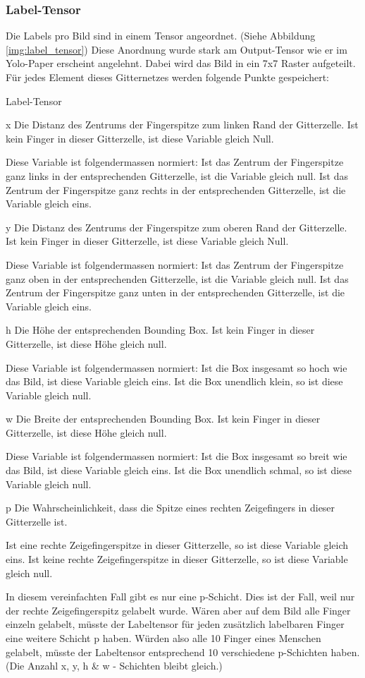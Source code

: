 \subsubsection{Label-Tensor}
\label{chapter:label_tensor}
Die Labels pro Bild sind in einem Tensor angeordnet. 
(Siehe Abbildung \ref{img:label_tensor})
Diese Anordnung wurde stark am Output-Tensor wie er im Yolo-Paper \cite{yolo} erscheint angelehnt.
Dabei wird das Bild in ein 7x7 Raster aufgeteilt.
Für jedes Element dieses Gitternetzes werden folgende Punkte gespeichert:
\begin{labeling}{Label-Tensor}
\item[x] Die Distanz des Zentrums der Fingerspitze zum linken Rand der Gitterzelle.
Ist kein Finger in dieser Gitterzelle, ist diese Variable gleich Null.

Diese Variable ist folgendermassen normiert: 
Ist das Zentrum der Fingerspitze ganz links in der entsprechenden Gitterzelle, ist die Variable gleich null.
Ist das Zentrum der Fingerspitze ganz rechts in der entsprechenden Gitterzelle, ist die Variable gleich eins.
\item[y] Die Distanz des Zentrums der Fingerspitze zum oberen Rand der Gitterzelle.
Ist kein Finger in dieser Gitterzelle, ist diese Variable gleich Null. 

Diese Variable ist folgendermassen normiert:
Ist das Zentrum der Fingerspitze ganz oben in der entsprechenden Gitterzelle, ist die Variable gleich null.
Ist das Zentrum der Fingerspitze ganz unten in der entsprechenden Gitterzelle, ist die Variable gleich eins.
\item[h] Die Höhe der entsprechenden Bounding Box.
Ist kein Finger in dieser Gitterzelle, ist diese Höhe gleich null.

Diese Variable ist folgendermassen normiert:
Ist die Box insgesamt so hoch wie das Bild, ist diese Variable gleich eins. 
Ist die Box \grqq{}unendlich\grqq{} klein, so ist diese Variable gleich null.
\item[w] Die Breite der entsprechenden Bounding Box.
Ist kein Finger in dieser Gitterzelle, ist diese Höhe gleich null.

Diese Variable ist folgendermassen normiert:
Ist die Box insgesamt so breit wie das Bild, ist diese Variable gleich eins.
Ist die Box \grqq{}unendlich\grqq{} schmal, so ist diese Variable gleich null.
\item[p] Die Wahrscheinlichkeit, dass die Spitze eines rechten Zeigefingers in dieser Gitterzelle ist. 

Ist eine rechte Zeigefingerspitze in dieser Gitterzelle, so ist diese Variable gleich eins.
Ist keine rechte Zeigefingerspitze in dieser Gitterzelle, so ist diese Variable gleich null.

In diesem vereinfachten Fall gibt es nur eine p-Schicht.
Dies ist der Fall, weil nur der rechte Zeigefingerspitz gelabelt wurde.
Wären aber auf dem Bild alle Finger einzeln gelabelt, müsste der Labeltensor für jeden zusätzlich labelbaren Finger eine weitere Schicht p haben. 
Würden also alle 10 Finger eines Menschen gelabelt, müsste der Labeltensor entsprechend 10 verschiedene p-Schichten haben.
(Die Anzahl x, y, h \& w - Schichten bleibt gleich.) 
\end{labeling}

